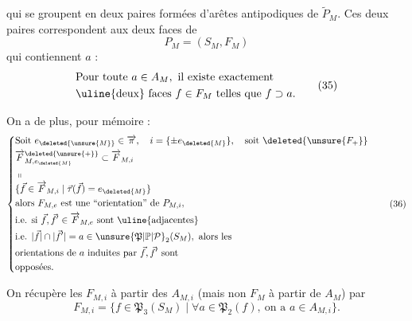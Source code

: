 qui se groupent en deux paires 
 formées d'arêtes antipodiques de $\widetilde{P}_M$.
Ces deux paires correspondent aux
deux faces de 
\[
P_M=(S_M,F_M)
\]
qui contiennent $a$ :
\[
\begin{aligned}
&\text{Pour toute }a\in A_M,\ \text{il existe exactement}\\
&\text{\uline{deux} faces } f\in F_M\ \text{telles que } f\supset a.
\end{aligned}\tag*{(35)}
\]

On a de plus, pour mémoire :
\[
\left\{\begin{aligned}
&\text{Soit } e_{\deleted{\unsure{M}}}\in\overrightarrow\pi,\quad i=\{\pm e_{\deleted{M}}\},\quad\text{soit }\deleted{\unsure{F_+}}\\
&\overrightarrow F_{M,e_{\deleted{M}}}^{\deleted{\unsure{+}}}\subset\overrightarrow F_{M,i}\\
&\shortparallel\\[-3pt]
&\{\vec f\in\overrightarrow F_{M,i}\mid\vec\tau(\vec f)=e_{\deleted{M}}\}\\
&\text{alors }F_{M,e}\text{ est une ``orientation'' de }P_{M,i},\\
&\text{i.e. si }\vec f,\vec f'\in\overrightarrow F_{M,e}\text{ sont \uline{adjacentes}}\\
&\text{i.e. }|\vec f|\cap|\vec f'|=a\in\unsure{\mathfrak P|\mathbb P|\mathcal P}_2(S_M),\ \text{alors les}\\
&\text{orientations de }a\text{ induites par }\vec f,\vec f'\text{ sont}\\
&\text{opposées}.
\end{aligned}\right.\tag*{(36)}
\]

On récupère les $F_{M,i}$ à partir des $A_{M,i}$
(mais non $F_M$ à partir de $A_M$) par
\[
F_{M,i}=\{f\in\mathfrak P_3(S_M)\mid\forall a\in\mathfrak P_2(f),\ \text{on a }a\in A_{M,i}\}.\tag*{(37)}
\]
